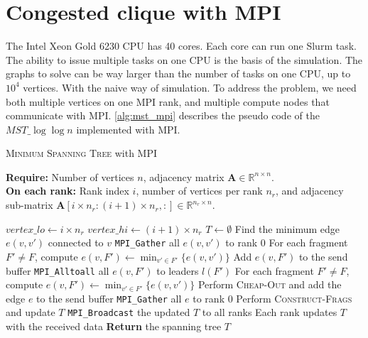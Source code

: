 \documentclass[english, 12pt, a4paper, elec, utf8, a-2b, online]{aaltothesis}
\newcommand{\mstalgo}{$MST\_\log\log{n}$}
\begin{document}
\section{Congested clique with MPI}
\label{sec:mpi}
The Intel Xeon Gold 6230 CPU has 40 cores. Each core can run one Slurm task. The ability to issue multiple tasks on one CPU is the basis of the simulation. The graphs to solve can be way larger than the number of tasks on one CPU, up to $10^4$ vertices. With the naive way of simulation. To address the problem, we need both multiple vertices on one MPI rank, and multiple compute nodes that communicate with MPI. \cref{alg:mst_mpi} describes the pseudo code of the \mstalgo{} implemented with MPI.
\begin{algorithm}
	\caption{\textsc{Minimum Spanning Tree} with MPI}
	\label{alg:mst_mpi}
	\textbf{Require:} Number of vertices $n$, adjacency matrix $\mathbf{A} \in \mathbb{R}^{n \times n}$.\\
	\textbf{On each rank:} Rank index $i$, number of vertices per rank $n_r$, and adjacency sub-matrix $\mathbf{A}[i \times n_r : (i + 1) \times n_r, :] \in \mathbb{R}^{n_r \times n}$.
	\begin{algorithmic}[1]
	\State $vertex\_lo \gets i \times n_r$
	\State $vertex\_hi \gets (i + 1) \times n_r$
	\State $T \gets \emptyset$
				\State Find the minimum edge $e(v, v')$ connected to $v$
			\EndFor
			\State \texttt{MPI\_Gather} all $e(v, v')$ to rank 0
		\Else
				\State For each fragment $F' \neq F$, compute $e(v, F') \gets \min_{v' \in F'} \{ e(v, v') \}$
				\State Add $e(v, F')$ to the send buffer
			\EndFor
			\State \texttt{MPI\_Alltoall} all $e(v, F')$ to leaders $l(F')$
					\State For each fragment $F' \neq F$, compute $e(v, F') \gets \min_{v' \in F'} \{ e(v, v') \}$
					\State Perform \textsc{Cheap-Out} and add the edge $e$ to the send buffer
				\EndIf
			\EndFor
			\State \texttt{MPI\_Gather} all $e$ to rank 0
		\EndIf
			\State Perform \textsc{Construct-Frags} and update $T$
			\State \texttt{MPI\_Broadcast} the updated $T$ to all ranks
		\EndIf
		\State Each rank updates $T$ with the received data
	\EndWhile
	\State \textbf{Return} the spanning tree $T$
	\end{algorithmic}
\end{algorithm}
\end{document}
